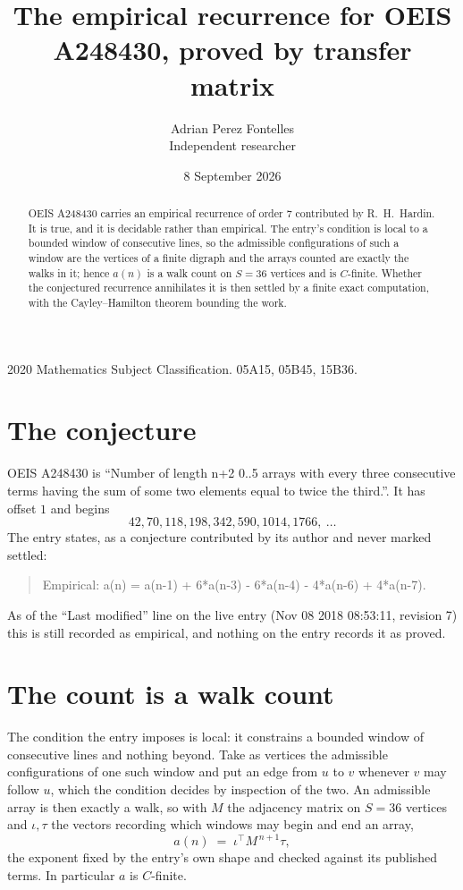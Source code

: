 \documentclass[11pt,a4paper]{article}
\title{The empirical recurrence for OEIS A248430, proved by transfer matrix}
\author{Adrian Perez Fontelles\\ \small Independent researcher}
\date{8 September 2026}
\theoremstyle{plain}
\theoremstyle{definition}
\begin{document}
\maketitle

\begin{abstract}
OEIS A248430 carries an empirical recurrence of order $7$ contributed by R.~H.~Hardin. It is
true, and it is decidable rather than empirical. The entry's condition is local to a bounded window of consecutive lines, so
the admissible configurations of such a window are the vertices of a finite digraph and the
arrays counted are exactly the walks in it; hence $a(n)$ is a walk count on $S=36$ vertices
and is $C$-finite. Whether the conjectured recurrence annihilates it is then settled by a
finite exact computation, with the Cayley--Hamilton theorem bounding the work.
\end{abstract}

\noindent\small 2020 Mathematics Subject Classification. 05A15, 05B45, 15B36.\normalsize

\section{The conjecture}

OEIS A248430 is ``Number of length n+2 0..5 arrays with every three consecutive terms having the sum of some two elements equal to twice the third.''. It has offset $1$ and begins
\[
42, 70, 118, 198, 342, 590, 1014, 1766,\ \dots
\]
The entry states, as a conjecture contributed by its author and never marked settled:
\begin{quote}
Empirical: a(n) = a(n-1) + 6*a(n-3) - 6*a(n-4) - 4*a(n-6) + 4*a(n-7).
\end{quote}
As of the ``Last modified'' line on the live entry (Nov 08 2018 08:53:11, revision 7) this is still
recorded as empirical, and nothing on the entry records it as proved.

\section{The count is a walk count}

The condition the entry imposes is local: it constrains a bounded window of consecutive lines and nothing beyond. Take as
vertices the admissible configurations of one such window and put an edge from $u$ to $v$
whenever $v$ may follow $u$, which the condition decides by inspection of the two. An
admissible array is then exactly a walk, so with $M$ the adjacency matrix on $S=36$ vertices
and $\iota,\tau$ the vectors recording which windows may begin and end an array,
\[
a(n)\;=\;\iota^{\!\top}M^{\,n+1}\tau ,
\]
the exponent fixed by the entry's own shape and checked against its published terms. In
particular $a$ is $C$-finite.
\end{document}
